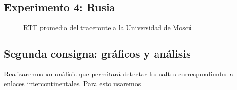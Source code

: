 \subsection{Experimento 4: Rusia}
\begin{figure}[H]
  \centering
  \caption{RTT promedio del traceroute a la Universidad de Moscú}
  \label{rusiaTTL}
\end{figure}



\subsection{Segunda consigna: gráficos y análisis}



Realizaremos un análisis que permitará detectar los saltos correspondientes a enlaces intercontinentales. Para esto usaremos 

